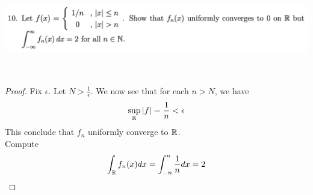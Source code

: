 \documentclass{report}
\begin{document}
\begin{question}{}{}
\includegraphics[height=4cm,width=18cm]{hw6a10}
\end{question}
\begin{proof}
Fix $\epsilon $. Let $N>\frac{1}{\epsilon }$. We now see that for each $n>N$, we have 
\begin{align*}
\sup_{\mathbb{R}} \left|f\right|= \frac{1}{n}< \epsilon 
\end{align*}
This conclude that $f_n$ uniformly converge to  $\mathbb{R}$.\\

Compute 
\begin{align*}
\int_{\mathbb{R}}f_n(x)dx=\int_{-n}^{n}\frac{1}{n}dx=2
\end{align*}
\end{proof}
\end{document}
